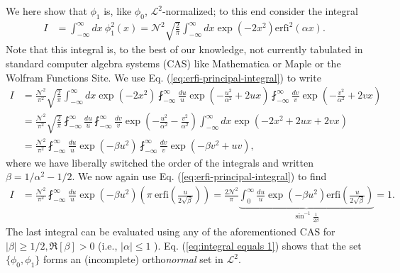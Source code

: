 \documentclass[11pt,letterpaper]{article}
\newcommand{\eq}[1]{\begin{align}#1\end{align}}
\newcommand{\erfi}{\text{erfi}}
\begin{document}
We here show that $\phi_1$ is, like $\phi_0$, $\mathcal{L}^2$-normalized; to this end consider the integral
\eq{
  I&=\int_{-\infty}^\infty dx \ \phi_1^2\left(x\right) =\mathcal{N}^2\sqrt{\frac{2}{\pi}}\int_{-\infty}^\infty dx  \exp\left(-2x^2\right)\erfi^2\left(\alpha x\right).
}
Note that this integral is, to the best of our knowledge, not currently tabulated in standard computer algebra systems (CAS) like Mathematica or Maple or the Wolfram Functions Site. 
We use Eq. (\ref{eq:erfi-principal-integral}) to write
\begin{subequations}
\eq{
  I&=\frac{\mathcal{N}^2}{\pi^2}\sqrt{\frac{2}{\pi}}\int_{-\infty}^\infty dx\exp\left(-2x^2\right)\fint_{-\infty}^\infty \frac{du}{u} \exp\left(-\frac{u^2}{\alpha^2}+2ux\right)\fint_{-\infty}^\infty \frac{dv}{v} \exp\left(-\frac{v^2}{\alpha^2}+2vx\right)\\
  &=\frac{\mathcal{N}^2}{\pi^2}\sqrt{\frac{2}{\pi}}\fint_{-\infty}^\infty \frac{du}{u}\fint_{-\infty}^\infty \frac{dv}{v}
  \exp\left(-\frac{u^2}{\alpha^2}-\frac{v^2}{\alpha^2}\right) \int_{-\infty}^\infty dx \exp\left(-2x^2+2ux+2vx\right)\\
  &=\frac{\mathcal{N}^2}{\pi^2}\fint_{-\infty}^\infty \frac{du}{u}\exp\left(-\beta u^2\right)\fint_{-\infty}^\infty \frac{dv}{v}
  \exp\left(-\beta v^2+uv\right),
}
\end{subequations}
where we have liberally switched the order of the integrals and written $\beta=1/\alpha^2-1/2$. We now again use Eq. (\ref{eq:erfi-principal-integral}) to find
\eq{
  I&=\frac{\mathcal{N}^2}{\pi^2}\fint_{-\infty}^\infty \frac{du}{u}\exp\left(-\beta u^2\right)\left(\pi \ \erfi\left(\frac{u}{2\sqrt{\beta}}\right)\right)
  =\frac{2\mathcal{N}^2}{\pi}\underbrace{\int_{0}^\infty \frac{du}{u}\exp\left(-\beta u^2\right)\erfi\left(\frac{u}{2\sqrt{\beta}}\right)}_{\sin^{-1}\frac{1}{2\beta}}
  =1.
  \label{eq:integral equals 1}
}
The last integral can be evaluated using any of the aforementioned CAS for $\left|\beta\right|\geq1/2,\Re\left[\beta\right]>0$ (i.e., $\left|\alpha\right|\leq 1$%
). Eq. (\ref{eq:integral equals 1}) shows that the set $\{\phi_0,\phi_1 \}$ forms an (incomplete) ortho\emph{normal} set in $\mathcal{L}^2$.
\end{document}
